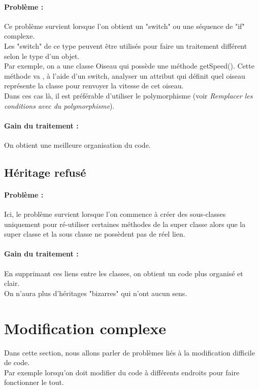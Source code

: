 \documentclass[a4paper,twoside,12pt,openright]{report}
\begin{document}
\paragraph{Problème :}
Ce problème survient lorsque l'on obtient un "switch" ou une séquence de "if" complexe.\\
Les "switch" de ce type peuvent être utilisés pour faire un traitement différent selon le type d'un objet.\\
Par exemple, on a une classe Oiseau qui possède une méthode getSpeed(). Cette méthode va , à l'aide d'un switch, analyser un attribut qui définit quel oiseau représente la classe pour renvoyer la vitesse de cet oiseau.\\
Dans ces cas là, il est préférable d'utiliser le polymorphisme (voir \textit{Remplacer les conditions avec du polymorphisme}).

\paragraph{Gain du traitement :}
On obtient une meilleure organisation du code.\\

\subsection{Héritage refusé}
\paragraph{Problème :}
Ici, le problème survient lorsque l'on commence à créer des sous-classes uniquement pour ré-utiliser certaines méthodes de la super classe alors que la super classe et la sous classe ne possèdent pas de réel lien.\\


\paragraph{Gain du traitement :}
En supprimant ces liens entre les classes, on obtient  un code plus organisé et clair.\\
On n'aura plus d'héritages "bizarres" qui n'ont aucun sens.\\

\section{Modification complexe}
Dans cette section, nous allons parler de problèmes liés à la modification difficile de code.\\
Par exemple lorsqu'on doit modifier du code à différents endroits pour faire fonctionner le tout.\\
\end{document}
